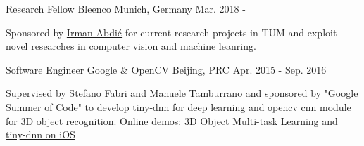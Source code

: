 


\begin{cventries}


\cventry
{Research Fellow} %
{Bleenco} %
{Munich, Germany} %
{Mar. 2018 - } %
{ %
\begin{cvitems}
\item {Sponsored by \href{https://www.linkedin.com/in/irmanabdic/?originalSubdomain=de}{Irman Abdić} for current research projects in TUM and exploit novel researches in computer vision and machine leanring.}
\end{cvitems}
}

\cventry
{Software Engineer} %
{Google \& OpenCV} %
{Beijing, PRC} %
{Apr. 2015 - Sep. 2016} %
{ %
\begin{cvitems}
\item {Supervised by \href{https://www.linkedin.com/in/stefano-fabri-16a73748}{Stefano Fabri} and \href{https://www.linkedin.com/in/manuele-tamburrano-b82384a5?authType=name&authToken=Di5p&trk=prof-sb-browse_map-name}{Manuele Tamburrano} and sponsored by "Google Summer of Code" to develop \href{https://github.com/tiny-dnn/tiny-dnn}{tiny-dnn} for deep learning and opencv cnn module for 3D object recognition.
Online demos: \href{https://www.youtube.com/watch?v=Mc20rTYdXTE}{3D Object Multi-task Learning} and \href{https://drive.google.com/open?id=0B-RYa1FDOrYXVUEzcG1mdnl5a3M}{tiny-dnn on iOS}
}
\end{cvitems}
}


\end{cventries}
